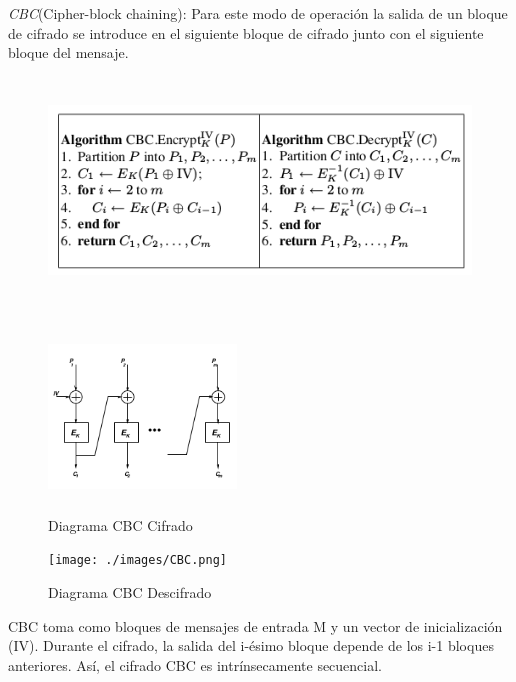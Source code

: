 \documentclass[12pt,oneside,onecolumn,openany]{report}
\begin{document}
\textit{CBC}(Cipher-block chaining): Para este modo de operación la salida de un bloque de cifrado se introduce en el siguiente bloque de cifrado junto con el siguiente bloque del mensaje.\\


 \begin{figure}[H]
 \centering
	\includegraphics[width=14cm, height=6cm]{./images/pcbc.png}
	
\end{figure}

\begin{figure}[H]
\centering
	\includegraphics[width=5cm, height=5cm]{./images/cbc1.png}
	\caption{Diagrama CBC Cifrado}
	\label{fig:1-4-1}
\end{figure}
\begin{figure}[H]
\centering
	\texttt{[image: ./images/CBC.png]}
	\caption{Diagrama CBC Descifrado}
	\label{fig:1-4-1}
\end{figure}
CBC toma como bloques de mensajes de entrada M y un vector de inicialización (IV). Durante el cifrado, la salida del i-ésimo bloque depende de los i-1 bloques anteriores. Así, el cifrado CBC es intrínsecamente secuencial.\\
\end{document}
